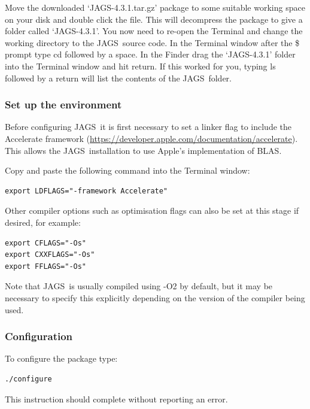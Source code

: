 \documentclass[11pt, a4paper, titlepage]{article}
\newcommand{\release}{4.3.1}
\newcommand{\JAGS}{\textsf{JAGS}}
\newcommand{\code}[1]{{\bgroup{\normalfont\ttfamily #1}\egroup}}
\newcommand{\file}[1]{{`\normalfont\textsf{#1}'}}
\begin{document}
Move the downloaded \file{JAGS-\release.tar.gz} package to some suitable
working space on your disk and double click the file.  This will
decompress the package to give a folder called \file{JAGS-\release}.  
You now need to re-open the Terminal and
change the working directory to the \JAGS\ source code. In the Terminal
window after the \$ prompt type \code{cd} followed by a space.  In the Finder
drag the \file{JAGS-\release} folder into the Terminal window and hit return.  If this
worked for you, typing \code{ls} followed by a return will list the contents
of the \JAGS\ folder.


\subsubsection{Set up the environment}
\label{section:osxenvironment}

Before configuring \JAGS\ it is first necessary to set a linker flag to
include the Accelerate framework (\url{https://developer.apple.com/documentation/accelerate}).  
This allows the \JAGS\ installation to use Apple's implementation of BLAS.

Copy and paste the following command into the Terminal window:

\begin{verbatim}
export LDFLAGS="-framework Accelerate"
\end{verbatim}

Other compiler options such as optimisation flags can also be set at 
this stage if desired, for example:

\begin{verbatim}
export CFLAGS="-Os"
export CXXFLAGS="-Os"
export FFLAGS="-Os"
\end{verbatim}

Note that \JAGS\ is usually compiled using \code{-O2} by default, but 
it may be necessary to specify this explicitly depending on the version
of the compiler being used.

\subsubsection{Configuration}

To configure the package type:

\begin{verbatim}
./configure
\end{verbatim}

This instruction should complete without reporting an error.
\end{document}
